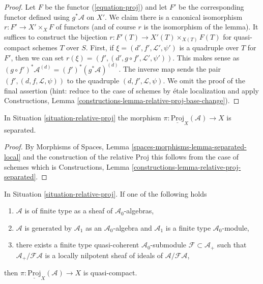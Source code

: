 \begin{proof}
Let $F$ be the functor (\ref{equation-proj}) and let $F'$ be the
corresponding functor defined using $g^*\mathcal{A}$ on $X'$.
We claim there is a canonical isomorphism $r : F' \to X' \times_X F$
of functors (and of course $r$ is the isomorphism of the lemma).
It suffices to construct the bijection
$r : F'(T) \to X'(T) \times_{X(T)} F(T)$ for quasi-compact schemes $T$
over $S$. First, if $\xi = (d', f', \mathcal{L}', \psi')$ is a
quadruple over $T$ for $F'$, then we can set
$r(\xi) = (f', (d', g \circ f', \mathcal{L}', \psi'))$. This makes sense
as $(g \circ f')^*\mathcal{A}^{(d)} = (f')^*(g^*\mathcal{A})^{(d)}$.
The inverse map sends the pair $(f', (d, f, \mathcal{L}, \psi))$
to the quadruple $(d, f', \mathcal{L}, \psi)$. We omit the proof
of the final assertion (hint: reduce to the case of schemes by \'etale
localization and apply Constructions, Lemma
\ref{constructions-lemma-relative-proj-base-change}).
\end{proof}

\begin{lemma}
\label{lemma-relative-proj-separated}
In Situation \ref{situation-relative-proj} the morphism
$\pi : \underline{\text{Proj}}_X(\mathcal{A}) \to X$
is separated.
\end{lemma}

\begin{proof}
By Morphisms of Spaces, Lemma \ref{spaces-morphisms-lemma-separated-local}
and the construction of the relative Proj this follows from the
case of schemes which is
Constructions, Lemma \ref{constructions-lemma-relative-proj-separated}.
\end{proof}

\begin{lemma}
\label{lemma-relative-proj-quasi-compact}
In Situation \ref{situation-relative-proj}. If one of the following holds
\begin{enumerate}
\item $\mathcal{A}$ is of finite type as a sheaf of
$\mathcal{A}_0$-algebras,
\item $\mathcal{A}$ is generated by $\mathcal{A}_1$ as an
$\mathcal{A}_0$-algebra and $\mathcal{A}_1$ is a finite type
$\mathcal{A}_0$-module,
\item there exists a finite type quasi-coherent $\mathcal{A}_0$-submodule
$\mathcal{F} \subset \mathcal{A}_{+}$ such that
$\mathcal{A}_{+}/\mathcal{F}\mathcal{A}$ is a locally nilpotent
sheaf of ideals of $\mathcal{A}/\mathcal{F}\mathcal{A}$,
\end{enumerate}
then $\pi : \underline{\text{Proj}}_X(\mathcal{A}) \to X$ is quasi-compact.
\end{lemma}

